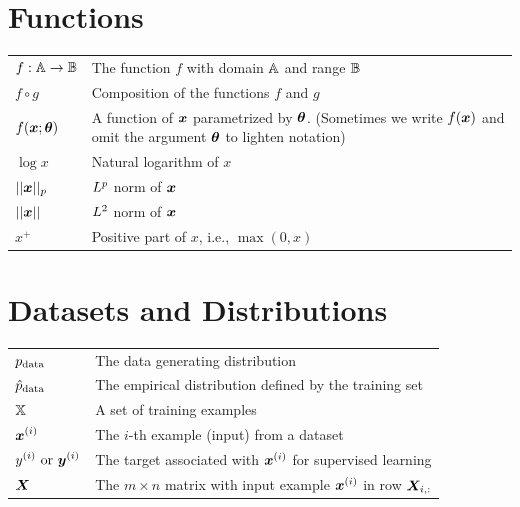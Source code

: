 \section*{Functions}
\def\arraystretch{1.5}
\begin{longtable}{p{}p{}}
$\displaystyle f: {\mathbb{A}} \rightarrow {\mathbb{B}}$ & The function $f$ with domain ${\mathbb{A}}$ and range ${\mathbb{B}}$\\
$\displaystyle f \circ g $ & Composition of the functions $f$ and $g$ \\
  $\displaystyle f({\bm{x}} ; {\bm{\theta}}) $ & A function of ${\bm{x}}$ parametrized by ${\bm{\theta}}$.
  (Sometimes we write $f({\bm{x}})$ and omit the argument ${\bm{\theta}}$ to lighten notation) \\
$\displaystyle \log x$ & Natural logarithm of $x$ \\
$\displaystyle || {\bm{x}} ||_p $ & $L^p$ norm of ${\bm{x}}$ \\
$\displaystyle || {\bm{x}} || $ & $L^2$ norm of ${\bm{x}}$ \\
$\displaystyle x^+$ & Positive part of $x$, i.e., $\max(0,x)$\\
\end{longtable}

%
\section*{Datasets and Distributions}
\def\arraystretch{1.5}
\begin{longtable}{p{}p{}}
$\displaystyle p_{\rm{data}}$ & The data generating distribution\\
$\displaystyle \hat{p}_{\rm{data}}$ & The empirical distribution defined by the training set\\
$\displaystyle {\mathbb{X}}$ & A set of training examples\\
$\displaystyle {\bm{x}}^{(i)}$ & The $i$-th example (input) from a dataset\\
$\displaystyle y^{(i)}\text{ or }{\bm{y}}^{(i)}$ & The target associated with ${\bm{x}}^{(i)}$ for supervised learning\\
$\displaystyle {\bm{X}}$ & The $m \times n$ matrix with input example ${\bm{x}}^{(i)}$ in row ${\bm{X}}_{i,:}$\\
\end{longtable}